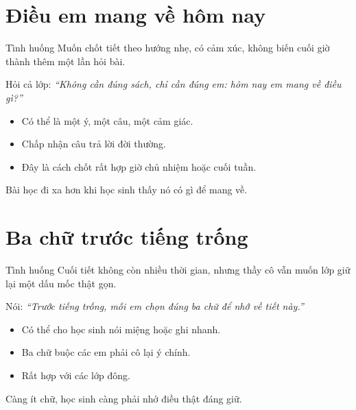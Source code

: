 \section{Điều em mang về hôm nay}
\begin{tinhhuong}{Tình huống}
Muốn chốt tiết theo hướng nhẹ, có cảm xúc, không biến cuối giờ thành thêm một lần hỏi bài.
\end{tinhhuong}
\begin{goiydungngay}
Hỏi cả lớp: \textit{``Không cần đúng sách, chỉ cần đúng em: hôm nay em mang về điều gì?''}
\begin{itemize}
\item Có thể là một ý, một câu, một cảm giác.
\item Chấp nhận câu trả lời đời thường.
\item Đây là cách chốt rất hợp giờ chủ nhiệm hoặc cuối tuần.
\end{itemize}
\end{goiydungngay}
\begin{cauchot}
Bài học đi xa hơn khi học sinh thấy nó có gì để mang về.
\end{cauchot}
\ngancach

\section{Ba chữ trước tiếng trống}
\begin{tinhhuong}{Tình huống}
Cuối tiết không còn nhiều thời gian, nhưng thầy cô vẫn muốn lớp giữ lại một dấu mốc thật gọn.
\end{tinhhuong}
\begin{goiydungngay}
Nói: \textit{``Trước tiếng trống, mỗi em chọn đúng ba chữ để nhớ về tiết này.''}
\begin{itemize}
\item Có thể cho học sinh nói miệng hoặc ghi nhanh.
\item Ba chữ buộc các em phải cô lại ý chính.
\item Rất hợp với các lớp đông.
\end{itemize}
\end{goiydungngay}
\begin{cauchot}
Càng ít chữ, học sinh càng phải nhớ điều thật đáng giữ.
\end{cauchot}
\ngancach

